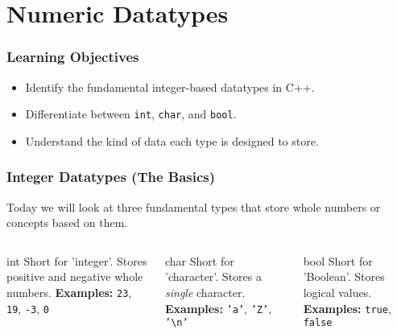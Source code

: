 \documentclass{beamer}
\begin{document}
\section{Numeric Datatypes}

\begin{frame}
\frametitle{Learning Objectives}
\begin{itemize}
    \item Identify the fundamental integer-based datatypes in C++.\pause
    \item Differentiate between \texttt{int}, \texttt{char}, and \texttt{bool}.\pause
    \item Understand the kind of data each type is designed to store.
\end{itemize}
\end{frame}

\begin{frame}
\frametitle{Integer Datatypes (The Basics)}
Today we will look at three fundamental types that store whole numbers or concepts based on them.\pause

\begin{columns}[T]
    \begin{column}{0.33\textwidth}
        \begin{alertblock}{int}
        Short for 'integer'. Stores positive and negative whole numbers.
        \vspace{1em}
        \textbf{Examples:} \texttt{23}, \texttt{19}, \texttt{-3}, \texttt{0}
        \end{alertblock}
    \end{column}\pause
    \begin{column}{0.33\textwidth}
        \begin{exampleblock}{char}
        Short for 'character'. Stores a \textit{single} character.
        \vspace{1em}
        \textbf{Examples:} \texttt{'a'}, \texttt{'Z'}, \texttt{'\textbackslash n'}
        \end{exampleblock}
    \end{column}\pause
    \begin{column}{0.33\textwidth}
        \begin{block}{bool}
        Short for 'Boolean'. Stores logical values.
        \vspace{1em}
        \textbf{Examples:} \texttt{true}, \texttt{false}
        \end{block}
    \end{column}
\end{columns}
\end{frame}
\end{document}
